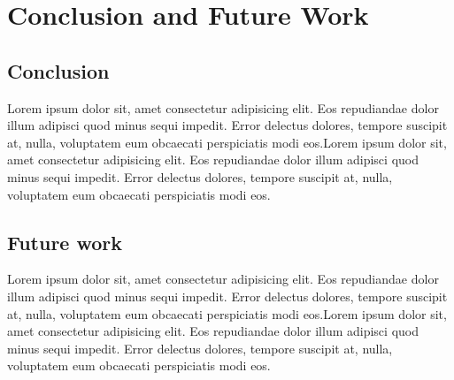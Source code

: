\chapter{Conclusion and Future Work}\label{Conclusion and Future Work}
\section{Conclusion}

Lorem ipsum dolor sit, amet consectetur adipisicing elit. Eos repudiandae dolor illum adipisci quod minus sequi impedit. Error delectus dolores, tempore suscipit at, nulla, voluptatem eum obcaecati perspiciatis modi eos.Lorem ipsum dolor sit, amet consectetur adipisicing elit. Eos repudiandae dolor illum adipisci quod minus sequi impedit. Error delectus dolores, tempore suscipit at, nulla, voluptatem eum obcaecati perspiciatis modi eos.
\section{Future work}

Lorem ipsum dolor sit, amet consectetur adipisicing elit. Eos repudiandae dolor illum adipisci quod minus sequi impedit. Error delectus dolores, tempore suscipit at, nulla, voluptatem eum obcaecati perspiciatis modi eos.Lorem ipsum dolor sit, amet consectetur adipisicing elit. Eos repudiandae dolor illum adipisci quod minus sequi impedit. Error delectus dolores, tempore suscipit at, nulla, voluptatem eum obcaecati perspiciatis modi eos.